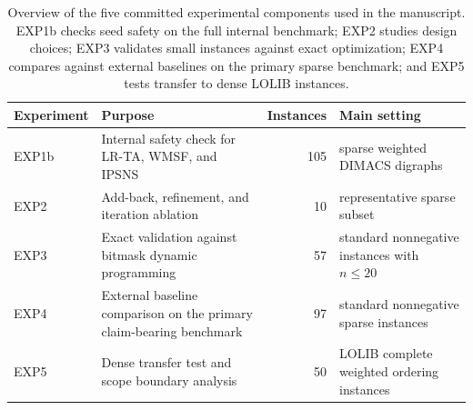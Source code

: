 \begin{table}[t]
\centering
\small
\caption{Overview of the five committed experimental components used in the manuscript. EXP1b checks seed safety on the full internal benchmark; EXP2 studies design choices; EXP3 validates small instances against exact optimization; EXP4 compares against external baselines on the primary sparse benchmark; and EXP5 tests transfer to dense LOLIB instances.}
\label{tab:experiment-overview}
\begin{tabularx}{\linewidth}{@{}lXrX@{}}
\toprule
Experiment & Purpose & Instances & Main setting \\
\midrule
EXP1b & Internal safety check for LR-TA, WMSF, and IPSNS & 105 & sparse weighted DIMACS digraphs \\
EXP2 & Add-back, refinement, and iteration ablation & 10 & representative sparse subset \\
EXP3 & Exact validation against bitmask dynamic programming & 57 & standard nonnegative instances with $n \le 20$ \\
EXP4 & External baseline comparison on the primary claim-bearing benchmark & 97 & standard nonnegative sparse instances \\
EXP5 & Dense transfer test and scope boundary analysis & 50 & LOLIB complete weighted ordering instances \\
\bottomrule
\end{tabularx}
\end{table}
